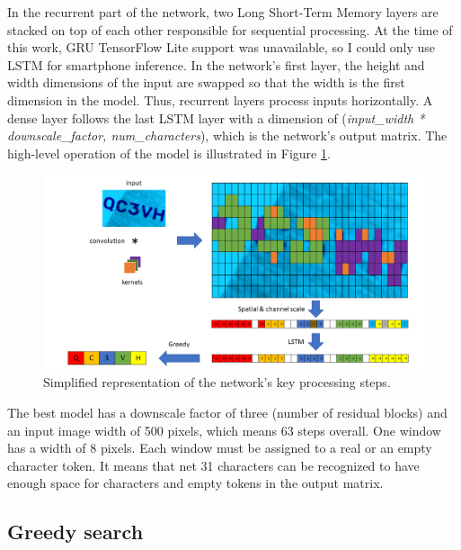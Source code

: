 In the recurrent part of the network, two Long Short-Term Memory\cite{LSTM} layers are stacked on top of each other responsible for sequential processing. At the time of this work, GRU TensorFlow Lite support was unavailable, so I could only use LSTM for smartphone inference. In the network's first layer, the height and width dimensions of the input are swapped so that the width is the first dimension in the model. Thus, recurrent layers process inputs horizontally. A dense layer follows the last LSTM layer with a dimension of (\textit{input\_width * downscale\_factor, num\_characters}), which is the network's output matrix. The high-level operation of the model is illustrated in Figure \ref{fig:processing_steps}.

\begin{figure}[htb]
 \centerline{\includegraphics[width=1.0\columnwidth]{.//Figure/OCR/processing_steps.png}}
 \caption{Simplified representation of the network's key processing steps.}
 \label{fig:processing_steps}
\end{figure}

The best model has a downscale factor of three (number of residual blocks) and an input image width of 500 pixels, which means 63 steps overall. One window has a width of 8 pixels. Each window must be assigned to a real or an empty character token. It means that net 31 characters can be recognized to have enough space for characters and empty tokens in the output matrix.

\subsection{Greedy search}

